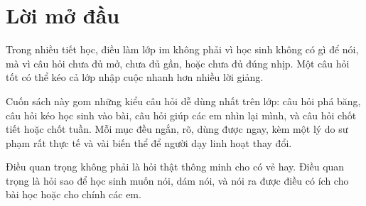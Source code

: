 \chapter*{Lời mở đầu}

Trong nhiều tiết học, điều làm lớp im không phải vì học sinh không có gì để nói, mà vì câu hỏi chưa đủ mở, chưa đủ gần, hoặc chưa đủ đúng nhịp. Một câu hỏi tốt có thể kéo cả lớp nhập cuộc nhanh hơn nhiều lời giảng.

Cuốn sách này gom những kiểu câu hỏi dễ dùng nhất trên lớp: câu hỏi phá băng, câu hỏi kéo học sinh vào bài, câu hỏi giúp các em nhìn lại mình, và câu hỏi chốt tiết hoặc chốt tuần. Mỗi mục đều ngắn, rõ, dùng được ngay, kèm một lý do sư phạm rất thực tế và vài biến thể để người dạy linh hoạt thay đổi.

Điều quan trọng không phải là hỏi thật thông minh cho có vẻ hay. Điều quan trọng là hỏi sao để học sinh muốn nói, dám nói, và nói ra được điều có ích cho bài học hoặc cho chính các em.
